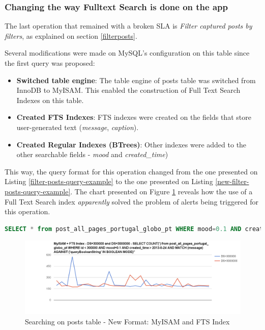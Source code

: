 \clearpage
\subsubsection{Changing the way Fulltext Search is done on the app}
\label{changing-fulltext-search}
The last operation that remained with a broken SLA is \textit{Filter captured posts by filters}, as explained on section \ref{filterposts}.

Several modifications were made on MySQL's configuration on this table since the first query was proposed:
\begin{itemize}
\item{\textbf{Switched table engine}: The table engine of posts table was switched from InnoDB to MyISAM. This enabled the construction of Full Text Search Indexes on this table.}
\item{\textbf{Created FTS Indexes}: FTS indexes were created on the fields that store user-generated text (\textit{message}, \textit{caption}).}
\item{\textbf{Created Regular Indexes (BTrees)}: Other indexes were added to the other searchable fields - \textit{mood} and \textit{created\_time})}
\end{itemize}

This way, the query format for this operation changed from the one presented on Listing \ref{filter-posts-query-example} to the one presented on Listing \ref{new-filter-posts-query-example}. The chart presented on Figure \ref{fig:myISAM-FTSIndex} reveals how the use of a Full Text Search index \textit{apparently} solved the problem of alerts being triggered for this operation.  

\begin{lstlisting}[language=SQL,firstnumber=1, caption=New filter posts query format, label=new-filter-posts-query-example]
SELECT * from post_all_pages_portugal_globo_pt WHERE mood=0.1 AND created_time > 2013-5-24 AND MATCH (message) AGAINST ('booleanSearchString' IN BOOLEAN MODE)
\end{lstlisting} 


\begin{figure}[ht!]
	\centering
	\includegraphics[width=150mm]{Imagens/myISAM-FTSIndex.png}
	\caption{Searching on posts table - New Format: MyISAM and FTS Index \label{fig:myISAM-FTSIndex}}
\end{figure}


